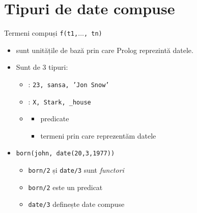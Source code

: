\documentclass[xcolor=x11names,compress,10pt]{beamer}
\begin{document}
\section{Tipuri de date compuse} \sectionframe
\begin{frame}{Termeni compuși \texttt{f(t1,$\ldots$, tn)}}
\begin{itemize}
	\item {} sunt unitățile de bază prin care Prolog reprezintă datele.
	\smallskip
	\item Sunt de 3 tipuri:
	\begin{itemize}
		\smallskip
		\item {}:
		 \texttt{23, sansa, 'Jon Snow'}
		\smallskip
		\item {}: \texttt{X, Stark, \_house}
		\smallskip
		\item {}
\begin{itemize}
\item predicate
\item termeni prin care reprezentăm datele 		\end{itemize}
\end{itemize}
\end{itemize}
\begin{example}
\begin{itemize}
\item \texttt{born(john, date(20,3,1977))}
\begin{itemize}
\item \texttt{born/2} și \texttt{date/3} sunt {\em functori}
\item \texttt{born/2} este un predicat
\item \texttt{date/3} definește  date compuse 
\end{itemize}

\end{itemize}
\end{example}
\end{frame}
\end{document}
